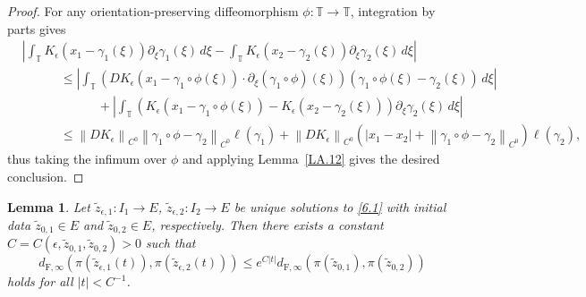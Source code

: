 \documentclass[reqno,centertags,12pt]{amsart}
\newtheorem{lemma}[theorem]{Lemma}
\theoremstyle{definition}
\numberwithin{equation}{section}
\newcommand{\abs}[1]{\left\lvert#1\right\rvert}
\newcommand{\norm}[1]{\left\|#1\right\|}
\newcommand{\bbT}{{\mathbb{T}}}
\begin{document}
\begin{proof}
    For any orientation-preserving diffeomorphism $\phi\colon\bbT\to\bbT$,
    integration by parts gives
    \begin{align*}
        &\abs{\int_{\bbT}K_{\epsilon}(x_{1} - \gamma_{1}(\xi))
        \partial_{\xi}\gamma_{1}(\xi)\,d\xi
        - \int_{\bbT}K_{\epsilon}(x_{2} - \gamma_{2}(\xi))
        \partial_{\xi}\gamma_{2}(\xi)\,d\xi}
        \\&\quad\quad\quad\leq
        \abs{\int_{\bbT}
        \left(
            DK_{\epsilon}(x_{1} - \gamma_{1}\circ\phi(\xi))
            \cdot \partial_{\xi}(\gamma_{1}\circ\phi)(\xi)
        \right)(\gamma_{1}\circ\phi(\xi) - \gamma_{2}(\xi))\,d\xi}
        \\&\quad\quad\quad\quad\quad\quad+
        \abs{\int_{\bbT}\left(
            K_{\epsilon}(x_{1} - \gamma_{1}\circ\phi(\xi))
            - K_{\epsilon}(x_{2} - \gamma_{2}(\xi))
        \right)\partial_{\xi}\gamma_{2}(\xi)\,d\xi}
        \\&\quad\quad\quad\leq
        \norm{DK_{\epsilon}}_{C^{0}}
        \norm{\gamma_{1}\circ\phi - \gamma_{2}}_{C^{0}}
        \ell(\gamma_{1})
        + \norm{DK_{\epsilon}}_{C^{0}}\left(
            \abs{x_{1} - x_{2}}
            + \norm{\gamma_{1}\circ\phi - \gamma_{2}}_{C^{0}}
        \right)\ell(\gamma_{2}),
    \end{align*}
    thus taking the infimum over $\phi$ and applying
    Lemma~\ref{LA.12} gives the desired conclusion.
\end{proof}

\begin{lemma}\label{L6.2}
    Let $\tilde{z}_{\epsilon,1}\colon I_{1}\to E$,
    $\tilde{z}_{\epsilon,2}\colon I_{2}\to E$ be unique solutions to
    \eqref{6.1} with initial data
    $\tilde{z}_{0,1}\in E$ and $\tilde{z}_{0,2}\in E$, respectively.
    Then there exists a constant $C=C(\epsilon,\tilde{z}_{0,1},\tilde{z}_{0,2})>0$ such that
    \[
        d_{\mathrm{F},\infty}(
            \pi(\tilde{z}_{\epsilon,1}(t)),
            \pi(\tilde{z}_{\epsilon,2}(t))
        )
        \leq e^{C\abs{t}}
        d_{\mathrm{F},\infty}(\pi(\tilde{z}_{0,1}), \pi(\tilde{z}_{0,2}))
    \]
    holds for all $\abs{t}<C^{-1}$.
\end{lemma}
\end{document}
